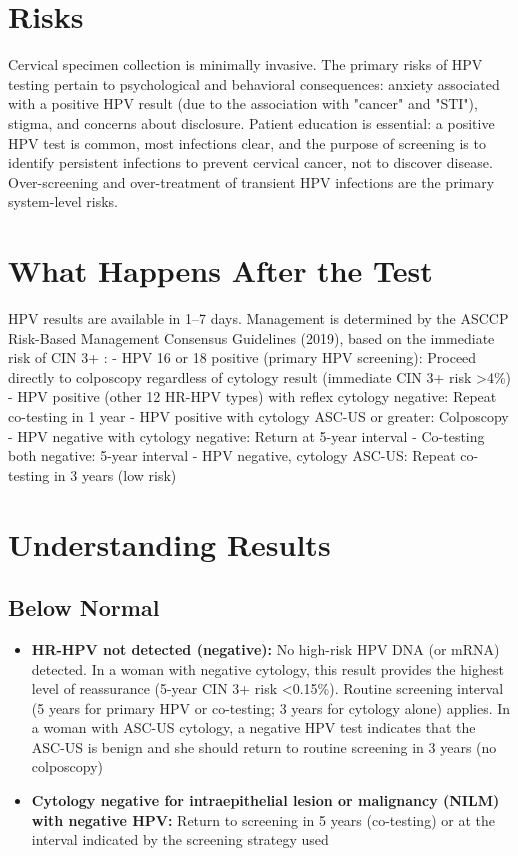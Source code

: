 \section*{Risks}
Cervical specimen collection is minimally invasive. The primary risks of HPV testing pertain to psychological and behavioral consequences: anxiety associated with a positive HPV result (due to the association with "cancer" and "STI"), stigma, and concerns about disclosure. Patient education is essential: a positive HPV test is common, most infections clear, and the purpose of screening is to identify persistent infections to prevent cervical cancer, not to discover disease. Over-screening and over-treatment of transient HPV infections are the primary system-level risks.

\section*{What Happens After the Test}
HPV results are available in 1--7 days. Management is determined by the ASCCP Risk-Based Management Consensus Guidelines (2019), based on the immediate risk of CIN 3+ \cite{perkins2020asccp}:
  - HPV 16 or 18 positive (primary HPV screening): Proceed directly to colposcopy regardless of cytology result (immediate CIN 3+ risk >4\%)
  - HPV positive (other 12 HR-HPV types) with reflex cytology negative: Repeat co-testing in 1 year
  - HPV positive with cytology ASC-US or greater: Colposcopy
  - HPV negative with cytology negative: Return at 5-year interval
  - Co-testing both negative: 5-year interval
  - HPV negative, cytology ASC-US: Repeat co-testing in 3 years (low risk)

\section*{Understanding Results}

\subsection*{Below Normal}
\begin{itemize}
  \item \textbf{HR-HPV not detected (negative):} No high-risk HPV DNA (or mRNA) detected. In a woman with negative cytology, this result provides the highest level of reassurance (5-year CIN 3+ risk <0.15\%). Routine screening interval (5 years for primary HPV or co-testing; 3 years for cytology alone) applies. In a woman with ASC-US cytology, a negative HPV test indicates that the ASC-US is benign and she should return to routine screening in 3 years (no colposcopy)
  \item \textbf{Cytology negative for intraepithelial lesion or malignancy (NILM) with negative HPV:} Return to screening in 5 years (co-testing) or at the interval indicated by the screening strategy used
\end{itemize}

